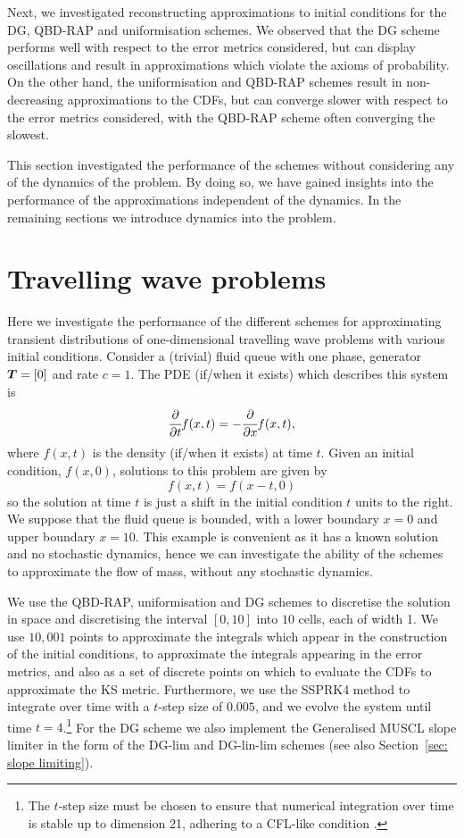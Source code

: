 Next, we investigated reconstructing approximations to initial conditions for the DG, QBD-RAP and uniformisation schemes. We observed that the DG scheme performs well with respect to the error metrics considered, but can display oscillations and result in approximations which violate the axioms of probability. On the other hand, the uniformisation and QBD-RAP schemes result in non-decreasing approximations to the CDFs, but can converge slower with respect to the error metrics considered, with the QBD-RAP scheme often converging the slowest. 

This section investigated the performance of the schemes without considering any of the dynamics of the problem. By doing so, we have gained insights into the performance of the approximations independent of the dynamics. In the remaining sections we introduce dynamics into the problem. %
\FloatBarrier

\section{Travelling wave problems}\label{sec: wave num}
Here we investigate the performance of the different schemes for approximating transient distributions of one-dimensional travelling wave problems with various initial conditions. Consider a (trivial) fluid queue with one phase, generator \(\boldsymbol T=[0]\) and rate \(c=1\). The PDE (if/when it exists) which describes this system is 
\[\cfrac{\partial}{\partial t} f(x,t) = -\cfrac{\partial}{\partial x} f(x,t),\]
where \(f(x,t)\) is the density (if/when it exists) at time \(t\). Given an initial condition, \(f(x,0)\), solutions to this problem are given by 
\[f(x,t) = f(x-t,0)\]
so the solution at time \(t\) is just a shift in the initial condition \(t\) units to the right. We suppose that the fluid queue is bounded, with a lower boundary \(x=0\) and upper boundary \(x=10\). This example is convenient as it has a known solution and no stochastic dynamics, hence we can investigate the ability of the schemes to approximate the flow of mass, without any stochastic dynamics. 

We use the QBD-RAP, uniformisation and DG schemes to discretise the solution in space and discretising the interval \([0,10]\) into \(10\) cells, each of width 1. We use $10,001$ points to approximate the integrals which appear in the construction of the initial conditions, to approximate the integrals appearing in the error metrics, and also as a set of discrete points on which to evaluate the CDFs to approximate the KS metric. Furthermore, we use the SSPRK4 method to integrate over time with a \(t\)-step size of \(0.005\), and we evolve the system until time \(t=4\).\footnote{The \(t\)-step size must be chosen to ensure that numerical integration over time is stable up to dimension 21, adhering to a CFL-like condition \cite[Section~4.8]{nodalDGBook}.} For the DG scheme we also implement the Generalised MUSCL slope limiter in the form of the DG-lim and DG-lin-lim schemes (see also Section~\ref{sec: slope limiting}). 

